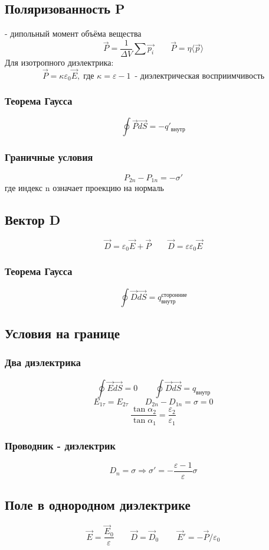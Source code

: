 \documentclass{article}
\begin{document}
\subsection{Поляризованность P}
- дипольный момент объёма вещества
\[\vec{P}=\frac{1}{\Delta V}\sum\vec{p_{i}} \qquad \vec{P}=\eta\langle\vec{p}\rangle\]
Для изотропного диэлектрика:
\[\vec{P}=\kappa\varepsilon_{0}\vec{E} ,\;\text{где } \kappa=\varepsilon-1\ \;\text{- диэлектрическая восприимчивость}\]
\subsubsection{Теорема Гаусса}
\[\oint\vec{P}\vec{dS}=-q'_{\text{внутр}}\]
\subsubsection{Граничные условия}
\[P_{2n}-P_{1n}=-\sigma'\]
где индекс n означает проекцию на нормаль

\subsection{Вектор D}
\[\vec{D}=\varepsilon_{0}\vec{E}+\vec{P} \qquad \vec{D}=\varepsilon\varepsilon_{0}\vec{E}\]
\subsubsection{Теорема Гаусса}
\[\oint\vec{D}\vec{dS}=q_{\text{внутр}}^{\text{сторонние}}\]

\subsection{Условия на границе}
\subsubsection{Два диэлектрика}
\[\oint\vec{E}\vec{dS}=0 \qquad \oint\vec{D}\vec{dS}=q_{\text{внутр}}\]
\[E_{1\tau}=E_{2\tau} \qquad D_{2n}-D_{1n}=\sigma=0\]
\[\frac{\tan\alpha_{2}}{\tan\alpha_{1}}=\frac{\varepsilon_{2}}{\varepsilon_{1}}\]
\subsubsection{Проводник - диэлектрик}
\[D_{n}=\sigma \Rightarrow \sigma'=-\frac{\varepsilon-1}{\varepsilon}\sigma\]

\subsection{Поле в однородном диэлектрике}
\[\vec{E}=\frac{\vec{E}_{0}}{\varepsilon} \qquad \vec{D}=\vec{D}_{0}\ \qquad \vec{E}'=-\vec{P}/\varepsilon_{0}\]
\end{document}
